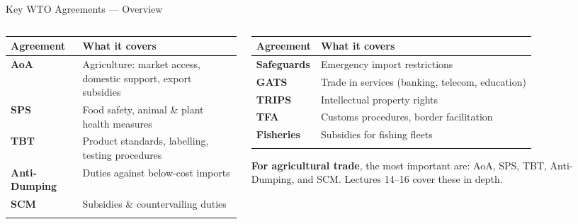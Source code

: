 \documentclass[
  ignorenonframetext,
  aspectratio=169,
]{beamer}
\makeatletter
\let\quarto@originallabel\label
\DeclareRobustCommand*{\label}[1]{\quarto@originallabel{#1}}
\makeatother
\begin{document}
\begin{frame}{Key WTO Agreements --- Overview}
\label{key-wto-agreements-overview}
\begin{columns}[T]
\begin{column}{0.5\linewidth}
\begin{longtable}[]{@{}
  >{\raggedright\arraybackslash}p{}
  >{\raggedright\arraybackslash}p{}@{}}
\toprule\noalign{}
\begin{minipage}[b]{\linewidth}\raggedright
Agreement
\end{minipage} & \begin{minipage}[b]{\linewidth}\raggedright
What it covers
\end{minipage} \\
\midrule\noalign{}
\endhead
\textbf{AoA} & Agriculture: market access, domestic support, export
subsidies \\
\textbf{SPS} & Food safety, animal \& plant health measures \\
\textbf{TBT} & Product standards, labelling, testing procedures \\
\textbf{Anti-Dumping} & Duties against below-cost imports \\
\textbf{SCM} & Subsidies \& countervailing duties \\
\bottomrule\noalign{}
\end{longtable}
\end{column}

\begin{column}{0.5\linewidth}
\begin{longtable}[]{@{}ll@{}}
\toprule\noalign{}
Agreement & What it covers \\
\midrule\noalign{}
\endhead
\textbf{Safeguards} & Emergency import restrictions \\
\textbf{GATS} & Trade in services (banking, telecom, education) \\
\textbf{TRIPS} & Intellectual property rights \\
\textbf{TFA} & Customs procedures, border facilitation \\
\textbf{Fisheries} & Subsidies for fishing fleets \\
\bottomrule\noalign{}
\end{longtable}

\textbf{For agricultural trade}, the most important are: AoA, SPS, TBT,
Anti-Dumping, and SCM. Lectures 14--16 cover these in depth.
\end{column}
\end{columns}
\end{frame}
\end{document}
